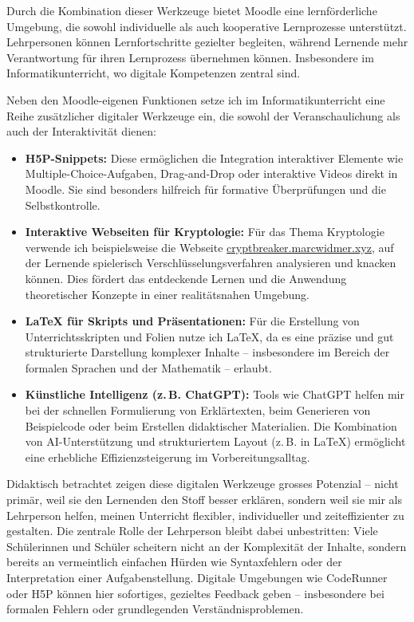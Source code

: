Durch die Kombination dieser Werkzeuge bietet Moodle eine lernförderliche Umgebung, die sowohl individuelle als auch kooperative Lernprozesse unterstützt. Lehrpersonen können Lernfortschritte gezielter begleiten, während Lernende mehr Verantwortung für ihren Lernprozess übernehmen können. Insbesondere im Informatikunterricht, wo digitale Kompetenzen zentral sind.

Neben den Moodle-eigenen Funktionen setze ich im Informatikunterricht eine Reihe zusätzlicher digitaler Werkzeuge ein, die sowohl der Veranschaulichung als auch der Interaktivität dienen:

\begin{itemize}
  \item \textbf{H5P-Snippets:} Diese ermöglichen die Integration interaktiver Elemente wie Multiple-Choice-Aufgaben, Drag-and-Drop oder interaktive Videos direkt in Moodle. Sie sind besonders hilfreich für formative Überprüfungen und die Selbstkontrolle.
  \item \textbf{Interaktive Webseiten für Kryptologie:} Für das Thema Kryptologie verwende ich beispielsweise die Webseite \href{https://cryptbreaker.marcwidmer.xyz}{cryptbreaker.marcwidmer.xyz}, auf der Lernende spielerisch Verschlüsselungsverfahren analysieren und knacken können. Dies fördert das entdeckende Lernen und die Anwendung theoretischer Konzepte in einer realitätsnahen Umgebung.
  \item \textbf{LaTeX für Skripts und Präsentationen:} Für die Erstellung von Unterrichtsskripten und Folien nutze ich LaTeX, da es eine präzise und gut strukturierte Darstellung komplexer Inhalte – insbesondere im Bereich der formalen Sprachen und der Mathematik – erlaubt. 
  \item \textbf{Künstliche Intelligenz (z.\,B. ChatGPT):} Tools wie ChatGPT helfen mir bei der schnellen Formulierung von Erklärtexten, beim Generieren von Beispielcode oder beim Erstellen didaktischer Materialien. Die Kombination von AI-Unterstützung und strukturiertem Layout (z.\,B. in LaTeX) ermöglicht eine erhebliche Effizienzsteigerung im Vorbereitungsalltag.
\end{itemize}

Didaktisch betrachtet zeigen diese digitalen Werkzeuge grosses Potenzial – nicht primär, weil sie den Lernenden den Stoff besser erklären, sondern weil sie mir als Lehrperson helfen, meinen Unterricht flexibler, individueller und zeiteffizienter zu gestalten. Die zentrale Rolle der Lehrperson bleibt dabei unbestritten: Viele Schülerinnen und Schüler scheitern nicht an der Komplexität der Inhalte, sondern bereits an vermeintlich einfachen Hürden wie Syntaxfehlern oder der Interpretation einer Aufgabenstellung. Digitale Umgebungen wie CodeRunner oder H5P können hier sofortiges, gezieltes Feedback geben – insbesondere bei formalen Fehlern oder grundlegenden Verständnisproblemen.

